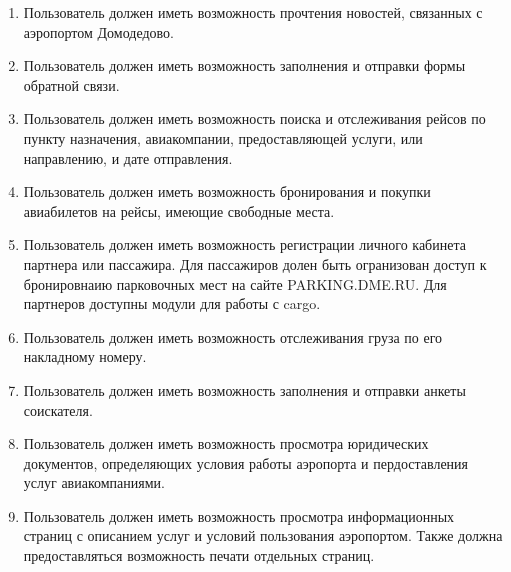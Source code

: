 \begin{enumerate}
\begin{enumerate}
                  \item Пользователь должен иметь возможность прочтения
                        новостей, связанных с аэропортом Домодедово.

                  \item Пользователь должен иметь возможность заполнения
                        и отправки формы обратной связи.

                  \item Пользователь должен иметь возможность поиска
                        и отслеживания рейсов по пункту назначения,
                        авиакомпании, предоставляющей услуги, или
                        направлению, и дате отправления.

                  \item Пользователь должен иметь возможность бронирования
                        и покупки авиабилетов на рейсы, имеющие
                        свободные места.

                  \item Пользователь должен иметь возможность
                        регистрации личного кабинета партнера или
                        пассажира. Для пассажиров долен быть
                        огранизован доступ к бронировнаию парковочных
                        мест на сайте PARKING.DME.RU. Для партнеров
                        доступны модули для работы с cargo.

                  \item Пользователь должен иметь возможность
                        отслеживания груза по его накладному номеру.

                  \item Пользователь должен иметь возможность
                        заполнения и отправки анкеты соискателя.

                  \item Пользователь должен иметь возможность
                        просмотра юридических документов, определяющих
                        условия работы аэропорта и пердоставления
                        услуг авиакомпаниями.

                  \item Пользователь должен иметь возможность просмотра
                        информационных страниц с описанием услуг и
                        условий пользования аэропортом. Также должна
                        предоставляться возможность печати отдельных
                        страниц.
            \end{enumerate}
\end{enumerate}
